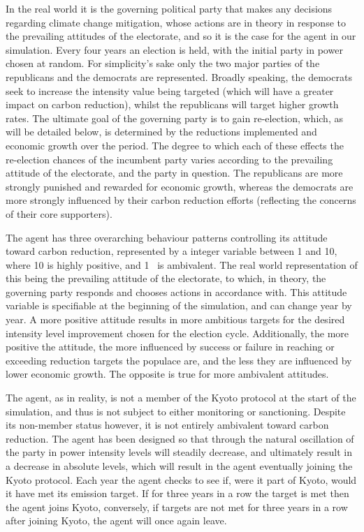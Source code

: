 \documentclass[]{article} %
\begin{document}
In the real world it is the governing political party that makes any decisions regarding climate change mitigation, whose actions are in theory in response to the prevailing attitudes of the electorate, and so it is the case for the agent in our simulation. Every four years an election is held, with the initial party in power chosen at random. For simplicity’s sake only the two major parties of the republicans and the democrats are represented. Broadly speaking, the democrats seek to increase the intensity value being targeted (which will have a greater impact on carbon reduction), whilst the republicans will target higher growth rates. The ultimate goal of the governing party is to gain re-election, which, as will be detailed below, is determined by the reductions implemented and economic growth over the period. The degree to which each of these effects the re-election chances of the incumbent party varies according to the prevailing attitude of the electorate, and the party in question. The republicans are more strongly punished and rewarded for economic growth, whereas the democrats are more strongly influenced by their carbon reduction efforts (reflecting the concerns of their core supporters). 

The agent has three overarching behaviour patterns controlling its attitude toward carbon reduction, represented by a integer variable between 1 and 10, where 10 is highly positive, and 1  is ambivalent. The real world representation of this being the prevailing attitude of the electorate, to which, in theory, the governing party responds and chooses actions in accordance with. This attitude variable is specifiable at the beginning of the simulation, and can change year by year. A more positive attitude results in more ambitious targets for the desired intensity level improvement chosen for the election cycle. Additionally, the more positive the attitude, the more influenced by success or failure in reaching or exceeding reduction targets the populace are, and the less they are influenced by lower economic growth. The opposite is true for more ambivalent attitudes.

The agent, as in reality, is not a member of the Kyoto protocol at the start of the simulation, and thus is not subject to either monitoring or sanctioning. Despite its non-member status however, it is not entirely ambivalent toward carbon reduction. The agent has been designed so that through the natural oscillation of the party in power intensity levels will steadily decrease, and ultimately result in a decrease in absolute levels, which will result in the agent eventually joining the Kyoto protocol. Each year the agent checks to see if, were it part of Kyoto, would it have met its emission target. If for three years in a row the target is met then the agent joins Kyoto, conversely, if targets are not met for three years in a row after joining Kyoto, the agent will once again leave.
\end{document}
